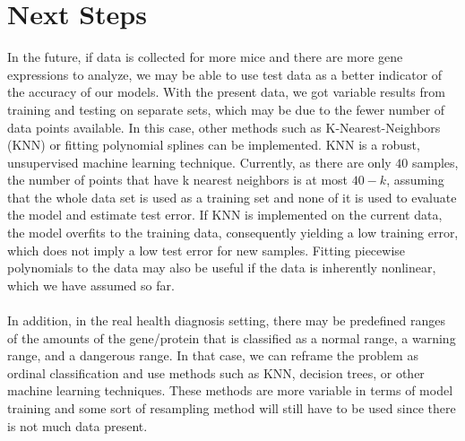 \documentclass{article}
\begin{document}
\section{Next Steps}
In the future, if data is collected for more mice and there are more gene expressions to analyze, we may be able to use test data as a better indicator of the accuracy of our models. With the present data, we got variable results from training and testing on separate sets, which may be due to the fewer number of data points available. In this case, other methods such as K-Nearest-Neighbors (KNN) or fitting polynomial splines can be implemented. KNN is a robust, unsupervised machine learning technique.  Currently, as there are only $40$ samples, the number of points that have k nearest neighbors is at most $40-k$, assuming that the whole data set is used as a training set and none of it is used to evaluate the model and estimate test error.  If KNN is implemented on the current data, the model overfits to the training data, consequently yielding a low training error, which does not imply a low test error for new samples.  Fitting piecewise polynomials to the data may also be useful if the data is inherently nonlinear, which we have assumed so far.  \\
\null\\
In addition, in the real health diagnosis setting, there may be predefined ranges of the amounts of the gene/protein that is classified as a normal range, a warning range, and a dangerous range.  In that case, we can reframe the problem as ordinal classification and use methods such as KNN, decision trees, or other machine learning techniques.  These methods are more variable in terms of model training and some sort of resampling method will still have to be used since there is not much data present. 
\newpage
\end{document}
